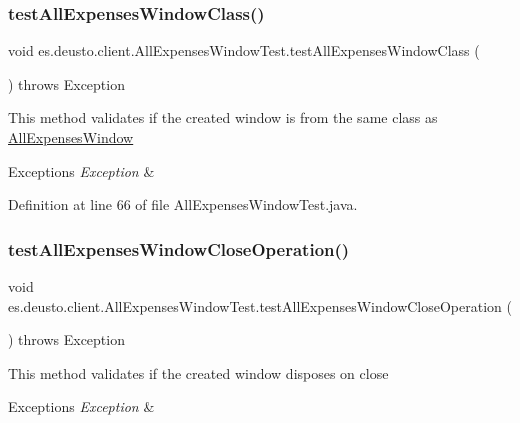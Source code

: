 \subsubsection{\texorpdfstring{test\+All\+Expenses\+Window\+Class()}{testAllExpensesWindowClass()}}
{\footnotesize\ttfamily void es.\+deusto.\+client.\+All\+Expenses\+Window\+Test.\+test\+All\+Expenses\+Window\+Class (\begin{DoxyParamCaption}{ }\end{DoxyParamCaption}) throws Exception}

This method validates if the created window is from the same class as \hyperlink{classes_1_1deusto_1_1client_1_1_all_expenses_window}{All\+Expenses\+Window}


\begin{DoxyExceptions}{Exceptions}
{\em Exception} & \\
\hline
\end{DoxyExceptions}


Definition at line 66 of file All\+Expenses\+Window\+Test.\+java.

\mbox{\label{classes_1_1deusto_1_1client_1_1_all_expenses_window_test_a049027a256d872c1999c6bf5f3032c4d}} 
\subsubsection{\texorpdfstring{test\+All\+Expenses\+Window\+Close\+Operation()}{testAllExpensesWindowCloseOperation()}}
{\footnotesize\ttfamily void es.\+deusto.\+client.\+All\+Expenses\+Window\+Test.\+test\+All\+Expenses\+Window\+Close\+Operation (\begin{DoxyParamCaption}{ }\end{DoxyParamCaption}) throws Exception}

This method validates if the created window disposes on close


\begin{DoxyExceptions}{Exceptions}
{\em Exception} & \\
\hline
\end{DoxyExceptions}


